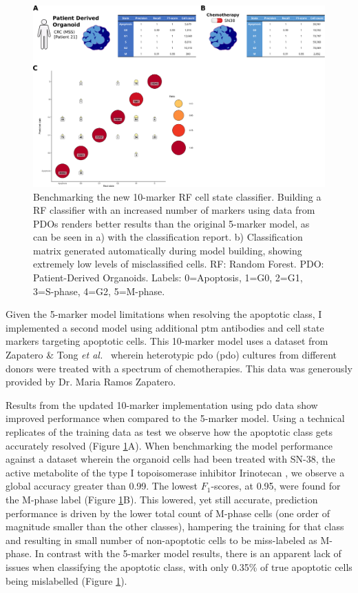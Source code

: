 \begin{figure}
    \centering
    \includegraphics{03cytof/figs/3CLASS_10m.png}
    \caption{Benchmarking the new 10-marker RF cell state classifier. Building a RF classifier with an increased number of markers using data from PDOs renders better results than the original 5-marker model, as can be seen in a) with the classification report. b) Classification matrix generated automatically during model building, showing extremely low levels of misclassified cells. RF: Random Forest. PDO: Patient-Derived Organoids. Labels: 0=Apoptosis, 1=G0, 2=G1, 3=S-phase, 4=G2, 5=M-phase.}
    \label{fig:3class10m}
\end{figure}

Given the 5-marker model limitations when resolving the apoptotic class, I implemented a second model using additional \acrshort{ptm} antibodies and cell state markers targeting apoptotic cells. This 10-marker model uses a dataset from Zapatero \& Tong \emph{et al.}~\cite{zapatero_trellis_2023} wherein heterotypic \acrlong{pdo} (\acrshort{pdo}) cultures from different donors were treated with a spectrum of chemotherapies. This data was generously provided by Dr. Maria Ramos Zapatero.

Results from the updated 10-marker implementation using \acrshort{pdo} data show improved performance when compared to the 5-marker model. Using a technical replicates of the training data as test we observe how the apoptotic class gets accurately resolved (Figure \ref{fig:3class10m}A). When benchmarking the model performance against a dataset wherein the organoid cells had been treated with SN-38, the active metabolite of the type I topoisomerase inhibitor Irinotecan \cite{mathijssen_clinical_2001}, we observe a global accuracy greater than 0.99. The lowest $F_1$-scores, at 0.95, were found for the M-phase label (Figure \ref{fig:3class10m}B). This lowered, yet still accurate, prediction performance is driven by the lower total count of M-phase cells (one order of magnitude smaller than the other classes), hampering the training for that class and resulting in small number of non-apoptotic cells to be miss-labeled as M-phase.
In contrast with the 5-marker model results, there is an apparent lack of issues when classifying the apoptotic class, with only 0.35\% of true apoptotic cells being mislabelled (Figure \ref{fig:3class10m}).

